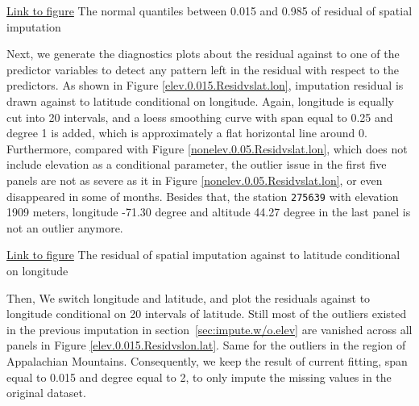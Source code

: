 \begin{framed}
\begin{center}
  \href{../plots/a1950/spaimpute/elev/d2/span0.015/a1950.spaResidcenter.bytime.pdf}
  {Link to figure}
  {The normal quantiles between 0.015 and 0.985 of residual of spatial imputation}
  \label{elev2.0.015.Residcenter.bytime}
\end{center}
\end{framed}

Next, we generate the diagnostics plots about the residual against to one of the 
predictor variables to detect any pattern left in the residual with respect to
the predictors. As shown in Figure
\href{../plots/a1950/spaimpute/elev/d2/span0.015/a1950.spaResid.vs.lat.lon.pdf}
{\ref*{elev.0.015.Residvslat.lon}}, imputation residual is drawn against to 
latitude conditional on longitude. Again, longitude is equally cut into 20 
intervals, and a loess smoothing curve with span equal to 0.25 and degree 1 is
added, which is approximately a flat horizontal line around 0. Furthermore, compared 
with Figure 
\href{../plots/a1950/spaimpute/nonelev/span0.05/a1950.spaResid.vs.lat.lon.pdf}
{\ref*{nonelev.0.05.Residvslat.lon}}, which does not include elevation as a
conditional parameter, the outlier issue in the first five panels are not as 
severe as it in Figure 
\href{../plots/a1950/spaimpute/nonelev/span0.05/a1950.spaResid.vs.lat.lon.pdf}
{\ref*{nonelev.0.05.Residvslat.lon}}, or even disappeared in some of months.
Besides that, the station \texttt{275639} with elevation 1909 meters, longitude 
-71.30 degree and altitude 44.27 degree in the last panel is not an outlier anymore.

\begin{framed}
\begin{center}
  \href{../plots/a1950/spaimpute/elev/d2/span0.015/a1950.spaResid.vs.lat.lon.pdf}
  {Link to figure}
  {The residual of spatial imputation against to latitude conditional on longitude}
  \label{elev.0.015.Residvslat.lon}
\end{center}
\end{framed}

Then, We switch longitude and latitude, and plot the residuals against to longitude
conditional on 20 intervals of latitude. Still most of the outliers existed in 
the previous imputation in section~\ref{sec:impute.w/o.elev} are vanished across
all panels in Figure
\href{../plots/a1950/spaimpute/elev/d2/span0.015/a1950.spaResid.vs.lon.lat.pdf}
{\ref*{elev.0.015.Residvslon.lat}}. Same for the outliers in the region of 
Appalachian Mountains. Consequently, we keep the result of current fitting, span 
equal to 0.015 and degree equal to 2, to only impute the missing values in the 
original dataset.

